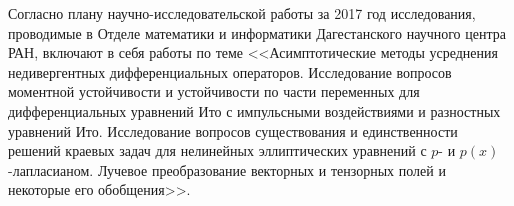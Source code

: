 \Introduction

Согласно плану научно-исследовательской работы за 2017 год исследования, проводимые в Отделе математики и информатики Дагестанского научного центра РАН, включают в себя работы по теме
<<Асимптотические методы усреднения недивергентных дифференциальных операторов. Исследование вопросов моментной устойчивости и устойчивости по части переменных для дифференциальных уравнений Ито с импульсными воздействиями и разностных уравнений Ито. Исследование вопросов существования и единственности решений краевых задач для нелинейных эллиптических уравнений с $p$- и $p(x)$-лапласианом. Лучевое преобразование векторных и тензорных полей и некоторые его обобщения>>.






